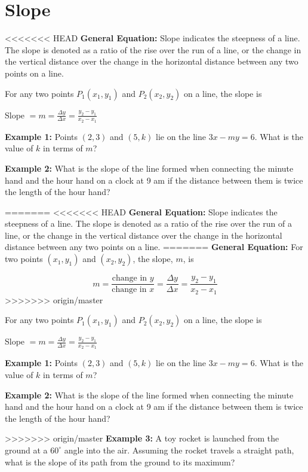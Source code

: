 \section{Slope}

<<<<<<< HEAD
\textbf{General Equation:} Slope indicates the steepness of a line. The slope is denoted as a ratio of the rise over the run of a line, or the change in the vertical distance over the change in the horizontal distance between any two points on a line.

\bigskip
For any two points $P_1(x_1,y_1)$ and $P_2(x_2,y_2)$ on a line, the slope is

\begin{center}
Slope $= m = \frac{\Delta y}{\Delta x}=\frac{y_2-y_1}{x_2-x_1}$
\end{center}

\vfill\textbf{Example 1:} Points $(2,3)$ and $(5,k)$ lie on the line $3x-my=6$. What is the value of $k$ in terms of $m$?

\vfill\textbf{Example 2:} What is the slope of the line formed when connecting the minute hand and the hour hand on a clock at 9 am if the distance between them is twice the length of the hour hand?

=======
<<<<<<< HEAD
\textbf{General Equation:} Slope indicates the steepness of a line. The slope is denoted as a ratio of the rise over the run of a line, or the change in the vertical distance over the change in the horizontal distance between any two points on a line.
=======
\textbf{General Equation:} For two points $(x_1,y_1)$ and $(x_2,y_2)$, the slope, $m$, is

\[m=\frac{\textrm{change in }y}{\textrm{change in }x}=\frac{\Delta y}{\Delta x}=\frac{y_2-y_1}{x_2-x_1}\]
>>>>>>> origin/master

\bigskip
For any two points $P_1(x_1,y_1)$ and $P_2(x_2,y_2)$ on a line, the slope is

\begin{center}
Slope $= m = \frac{\Delta y}{\Delta x}=\frac{y_2-y_1}{x_2-x_1}$
\end{center}

\vfill\textbf{Example 1:} Points $(2,3)$ and $(5,k)$ lie on the line $3x-my=6$. What is the value of $k$ in terms of $m$?

\vfill\textbf{Example 2:} What is the slope of the line formed when connecting the minute hand and the hour hand on a clock at 9 am if the distance between them is twice the length of the hour hand?

>>>>>>> origin/master
\vfill\textbf{Example 3:} A toy rocket is launched from the ground at a $60^\circ$ angle into the air. Assuming the rocket travels a straight path, what is the slope of its path from the ground to its maximum?

